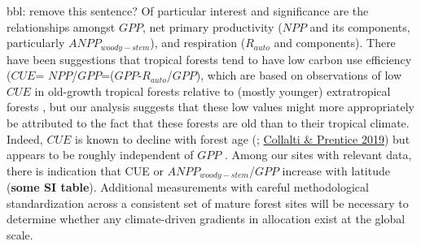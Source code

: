 \documentclass[]{article}
\begin{document}
bbl: remove this sentence? Of particular interest and significance are
the relationships amongst \(GPP\), net primary productivity (\(NPP\) and
its components, particularly \(ANPP_{woody-stem}\)), and respiration
(\(R_{auto}\) and components). There have been suggestions that tropical
forests tend to have low carbon use efficiency (\(CUE\)=
\(NPP\)/\(GPP\)=(\(GPP\)-\(R_{auto}\)/\(GPP\)), which are based on
observations of low \(CUE\) in old-growth tropical forests relative to
(mostly younger) extratropical forests
\citetext{\citealp{de_lucia_forest_2007}; \citealp[\href{https://www.researchgate.net/publication/227837530_The_productivity_metabolism_and_carbon_cycle_of_tropical_forest_vegetation}{Malhi
2012};][]{anderson-teixeira_carbon_2016}}, but our analysis suggests
that these low values might more appropriately be attributed to the fact
that these forests are old than to their tropical climate. Indeed,
\(CUE\) is known to decline with forest age
(\citep{de_lucia_forest_2007};
\href{https://academic.oup.com/treephys/article-abstract/39/8/1473/5423351?redirectedFrom=fulltext}{Collalti
\& Prentice 2019}) but appears to be roughly independent of \(GPP\)
\citep{litton_carbon_2007}. Among our sites with relevant data, there is
indication that CUE or \(ANPP_{woody-stem}\)/\(GPP\) increase with
latitude (\textbf{some SI table}). Additional measurements with careful
methodological standardization across a consistent set of mature forest
sites will be necessary to determine whether any climate-driven
gradients in allocation exist at the global scale.
\end{document}
